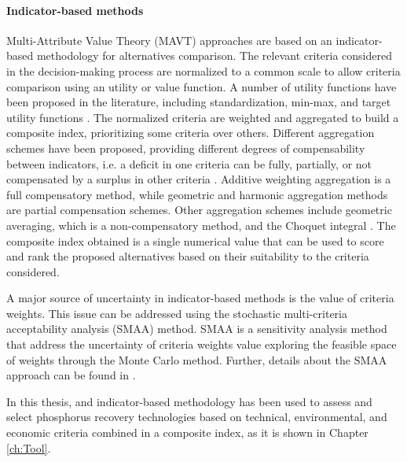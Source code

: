 \begin{refsection}[referencesCh1]
\paragraph{Indicator-based methods}
Multi-Attribute Value Theory (MAVT) approaches are based on an indicator-based methodology for alternatives comparison. The relevant criteria considered in the decision-making process are normalized to a common scale to allow criteria comparison using an utility or value function. A number of utility functions have been proposed in the literature, including standardization, min-max, and target utility functions \citep{HandbookCompositeIndicators}. 
The normalized criteria 
are weighted and aggregated to build a composite index, prioritizing some criteria over others. Different aggregation schemes have been proposed, providing different degrees of compensability between indicators, i.e. a deficit in one criteria can be fully, partially, or not compensated by a surplus in other criteria \citep{MarcoCinelli2020}. Additive weighting aggregation is a full compensatory method, while geometric and  harmonic aggregation methods are partial  compensation schemes. Other aggregation schemes include geometric averaging, which is a non-compensatory method, and the Choquet integral \citep{marichal2000determination}. The composite index obtained is a single numerical value that can be used to score and rank the proposed alternatives based on their suitability to the criteria considered. 

A major source of uncertainty in indicator-based methods is the value of criteria weights. This issue can be addressed using the stochastic multi-criteria acceptability analysis (SMAA) method. SMAA is a sensitivity analysis method that address the uncertainty of criteria weights value exploring the feasible space of weights through the Monte Carlo method. Further, details about the SMAA approach can be found in \citet{tervonen_implementing_2007}.

In this thesis, and indicator-based methodology has been used to assess and select phosphorus recovery technologies based on technical, environmental, and economic criteria combined in a composite index, as it is shown in Chapter \ref{ch:Tool}.


\end{refsection}
